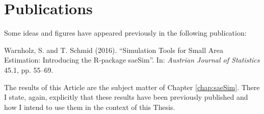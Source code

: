 

\chapter{Publications} %

Some ideas and figures have appeared previously in the following publication:

\bigskip

\noindent Warnholz, S. and T. Schmid (2016). “Simulation Tools for Small Area
Estimation: Introducing the R-package saeSim”. In: \textit{Austrian Journal
of Statistics} 45.1, pp. 55–69.

\bigskip

\noindent The results of this Article are the subject matter of Chapter
\ref{chap:saeSim}. There I state, again, explicitly that these results have been
previously published and how I intend to use them in the context of this Thesis.
